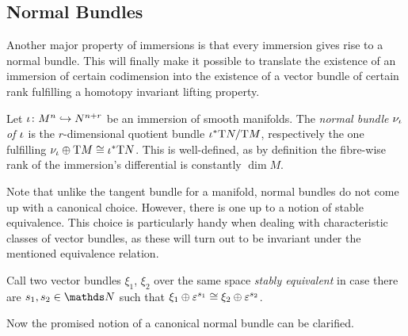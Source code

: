 \subsection{Normal Bundles}
Another major property of immersions is that every immersion gives
rise to a normal bundle. This will finally make it possible to
translate the existence of an immersion of certain codimension into
the existence of a vector bundle of certain rank fulfilling a homotopy
invariant lifting property.
\begin{Def}
  Let ${\iota}\colon M^n\hookrightarrow N^{n+r}$ be an immersion of smooth
  manifolds.
  The \emph{normal bundle $\nu_{{\iota}}$ of ${\iota}$}
  is the $r$-dimensional quotient bundle ${{\iota}}^*\mathrm{T}N/\mathrm{T}M$,
  respectively the one fulfilling
  $\nu_{{\iota}}\oplus\mathrm{T}M\cong{{\iota}}^*\mathrm{T}N$.
  This is well-defined, as by definition the fibre-wise rank of the
  immersion's differential is constantly $\dim M$.
\end{Def}
Note that unlike the tangent bundle for a manifold, normal bundles do
not come up with a canonical choice.
However, there is one up to a notion of stable equivalence.
This choice is particularly handy when dealing with
characteristic classes of vector bundles, as these will turn out to be
invariant under the mentioned equivalence relation.
\begin{Def}
  Call two vector bundles $\xi_1$, $\xi_2$ over the same space 
  \emph{stably equivalent} in case there are $s_1, s_2\in\Nat$ such
  that $\xi_1\oplus\varepsilon^{s_1}\cong\xi_2\oplus\varepsilon^{s_2}$.
\end{Def}
Now the promised notion of a canonical normal bundle can be clarified.
